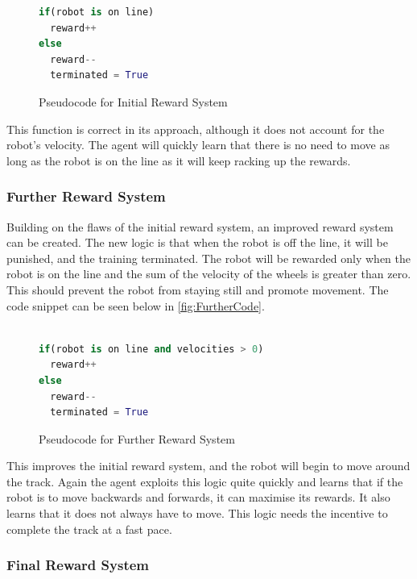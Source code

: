\documentclass[a4paper,12pt]{article}
\begin{document}
\begin{figure}[H]
\begin{lstlisting}[language=Python]
if(robot is on line)
  reward++
else
  reward--
  terminated = True
\end{lstlisting}
\caption{Pseudocode for Initial Reward System}
\label{fig:InitialCode}
\end{figure}
\noindent
This function is correct in its approach, although it does not account for the robot's velocity. The agent will quickly learn that there is no need to move as long as the robot is on the line as it will keep racking up the rewards.
 

\subsubsection{Further Reward System}

Building on the flaws of the initial reward system, an improved reward system can be created. The new logic is that when the robot is off the line, it will be punished, and the training terminated. The robot will be rewarded only when the robot is on the line and the sum of the velocity of the wheels is greater than zero. This should prevent the robot from staying still and promote movement. The code snippet can be seen below in \autoref{fig:FurtherCode}.
\\\\
\begin{figure}[H]
\begin{lstlisting}[language=Python]
if(robot is on line and velocities > 0)
  reward++
else
  reward--
  terminated = True
\end{lstlisting}
\caption{Pseudocode for Further Reward System}
\label{fig:FurtherCode}
\end{figure}
\noindent
This improves the initial reward system, and the robot will begin to move around the track. Again the agent exploits this logic quite quickly and learns that if the robot is to move backwards and forwards, it can maximise its rewards. It also learns that it does not always have to move. This logic needs the incentive to complete the track at a fast pace.


\subsubsection{Final Reward System} 
\end{document}
